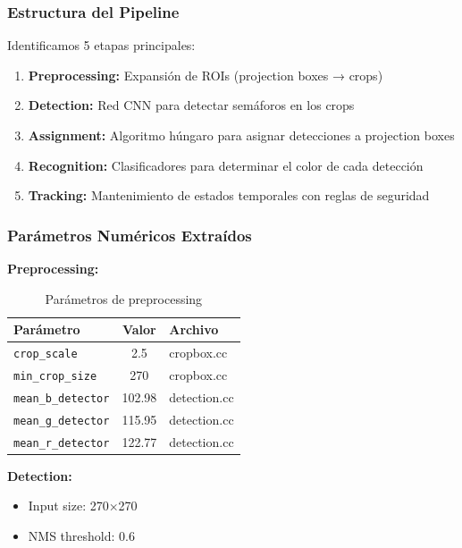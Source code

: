 \subsubsection{Estructura del Pipeline}

Identificamos 5 etapas principales:

\begin{enumerate}
    \item \textbf{Preprocessing:} Expansión de ROIs (projection boxes → crops)
    \item \textbf{Detection:} Red CNN para detectar semáforos en los crops
    \item \textbf{Assignment:} Algoritmo húngaro para asignar detecciones a projection boxes
    \item \textbf{Recognition:} Clasificadores para determinar el color de cada detección
    \item \textbf{Tracking:} Mantenimiento de estados temporales con reglas de seguridad
\end{enumerate}

\subsubsection{Parámetros Numéricos Extraídos}

\textbf{Preprocessing:}

\begin{table}[H]
\centering
\begin{tabular}{|l|c|l|}
\hline
\textbf{Parámetro} & \textbf{Valor} & \textbf{Archivo} \\
\hline
\texttt{crop\_scale} & 2.5 & cropbox.cc \\
\texttt{min\_crop\_size} & 270 & cropbox.cc \\
\texttt{mean\_b\_detector} & 102.98 & detection.cc \\
\texttt{mean\_g\_detector} & 115.95 & detection.cc \\
\texttt{mean\_r\_detector} & 122.77 & detection.cc \\
\hline
\end{tabular}
\caption{Parámetros de preprocessing}
\end{table}

\textbf{Detection:}

\begin{itemize}
    \item Input size: 270×270
    \item NMS threshold: 0.6
\end{itemize}


